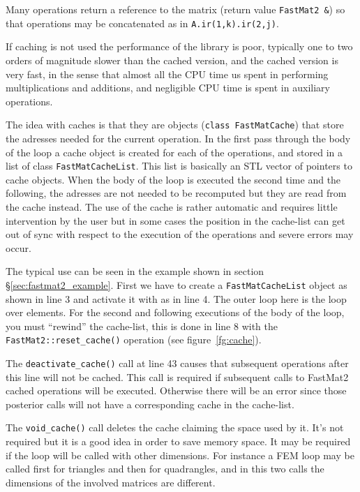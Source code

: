  Many operations return a
reference to the matrix (return value \verb+FastMat2 &+) so that
operations may be concatenated as in \verb+A.ir(1,k).ir(2,j)+.


If caching is not used the performance of the library is poor,
typically one to two orders of magnitude slower than the cached
version, and the cached version is very fast, in the sense that almost
all the CPU time us spent in performing multiplications and additions,
and negligible CPU time is spent in auxiliary operations. 

The idea with caches is that they are objects
(\verb+class FastMatCache+) that store the adresses needed for the
current operation. In the first pass through the body of the loop a
cache object is created for each of the operations, and stored in a
list of class \verb+FastMatCacheList+. This list is basically an STL
vector of pointers to cache objects. When the body of the loop is
executed the second time and the following, the adresses are not
needed to be recomputed but they are read from the cache instead. The
use of the cache is rather automatic and requires little intervention
by the user but in some cases the position in the cache-list can get
out of sync with respect to the execution of the operations and severe
errors may occur.

The typical use can be seen in the example shown in section
\S\ref{sec:fastmat2_example}. First we have to create a
\verb+FastMatCacheList+ object as shown in line 3 and activate it with
as in line 4. The outer loop here is the loop over elements. For the
second and following executions of the body of the loop, you must
``rewind'' the cache-list, this is done in line 8 with the
\verb+FastMat2::reset_cache()+ operation (see figure~\ref{fg:cache}).

The \verb+deactivate_cache()+ call at line 43 causes that subsequent
operations after this line will not be cached. This call is required
if subsequent calls to FastMat2 cached operations will be
executed. Otherwise there will be an error since those posterior calls
will not have a corresponding cache in the cache-list. 

The \verb+void_cache()+ call deletes the cache claiming the space used
by it. It's not required but it is a good idea in order to save memory
space. It may be required if the loop will be called with other
dimensions. For instance a FEM loop may be called first for triangles
and then for quadrangles, and in this two calls the dimensions of the
involved matrices are different. 

